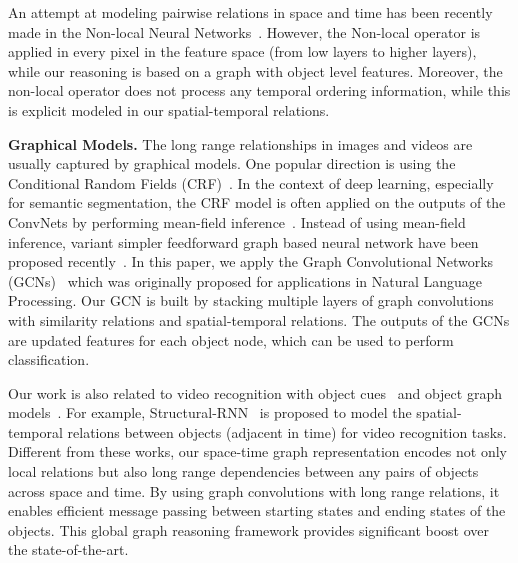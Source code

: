 \documentclass[runningheads]{llncs}
\begin{document}
An attempt at modeling pairwise relations in space and time has been recently made in the Non-local Neural Networks~\cite{xiaolongwang2017nonlocal}. However, the Non-local operator is applied in every pixel in the feature space (from low layers to higher layers), while our reasoning is based on a graph with object level features. Moreover, the non-local operator does not process any temporal ordering information, while this is explicit modeled in our spatial-temporal relations. 

\textbf{Graphical Models.} The long range relationships in images and videos are usually captured by graphical models. One popular direction is using the Conditional Random Fields (CRF)~\cite{Lafferty2001,Kraehenbuehl2011}. In the context of deep learning, especially for semantic segmentation, the CRF model is often applied on the outputs of the ConvNets by performing mean-field inference~\cite{Chen2014,Zheng2015,Chandra2017,Schwing2015,krahenbuhl2011efficient,Harley2017}. Instead of using mean-field inference, variant simpler feedforward graph based neural network have been proposed recently~\cite{Liu2017,Scarselli2009,kipf2017semi,YujiaGSNN2016,Marino17,stgcn2018aaai}. In this paper, we apply the Graph Convolutional Networks (GCNs)~\cite{kipf2017semi} which was originally proposed for applications in Natural Language Processing. Our GCN is built by stacking multiple layers of graph convolutions with similarity relations and spatial-temporal relations. The outputs of the GCNs are updated features for each object node, which can be used to perform classification. 

Our work is also related to video recognition with object cues~\cite{Alayrac17,Wu16CVPR,Heilbron17} and object graph models~\cite{Brendel11,ChenCVPR2012,Jain16,YuanyuanICCV2017}. For example, Structural-RNN~\cite{Jain16} is proposed to model the spatial-temporal relations between objects (adjacent in time) for video recognition tasks. Different from these works, our space-time graph representation encodes not only local relations but also long range dependencies between any pairs of objects across space and time. By using graph convolutions with long range relations, it enables efficient message passing between starting states and ending states of the objects. This global graph reasoning framework provides significant boost over the state-of-the-art. 


\vspace{-0.15in}
\end{document}
